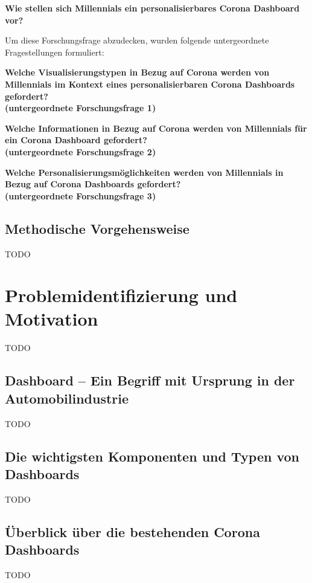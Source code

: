 \documentclass[12pt, oneside]{article}
\begin{document}
\begin{center}
\textbf{Wie stellen sich Millennials ein personalisierbares Corona Dashboard vor?}
\end{center}

Um diese Forschungsfrage abzudecken, wurden folgende untergeordnete Fragestellungen formuliert:

\begin{center}
\textbf{Welche Visualisierungstypen in Bezug auf Corona werden von Millennials im Kontext eines personalisierbaren Corona Dashboards gefordert?\\
(untergeordnete Forschungsfrage 1)}
\end{center}

\begin{center}
\textbf{Welche Informationen in Bezug auf Corona werden von Millennials für ein Corona Dashboard gefordert?\\
(untergeordnete Forschungsfrage 2)}
\end{center}

\begin{center}
\textbf{Welche Personalisierungsmöglichkeiten werden von Millennials in Bezug auf Corona Dashboards gefordert?\\
(untergeordnete Forschungsfrage 3)}
\end{center}

\subsection{Methodische Vorgehensweise}
TODO

\clearpage
\section{Problemidentifizierung und Motivation}
TODO

\subsection{Dashboard – Ein Begriff mit Ursprung in der Automobilindustrie}
TODO

\subsection{Die wichtigsten Komponenten und Typen von Dashboards}
TODO

\subsection{Überblick über die bestehenden Corona Dashboards}
TODO
\end{document}
